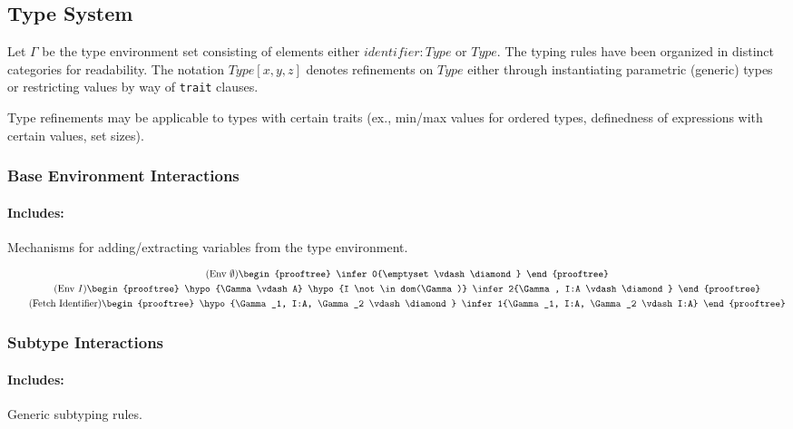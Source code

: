 
\subsection{Type System}
Let $\Gamma$ be the type environment set consisting of elements either $identifier: Type$ or $Type$. The typing rules have been organized in distinct categories for readability. The notation $Type[x, y, z]$ denotes refinements on $Type$ either through instantiating parametric (generic) types or restricting values by way of \texttt{trait} clauses.

Type refinements may be applicable to types with certain traits (ex., min/max values for ordered types, definedness of expressions with certain values, set sizes). %

\subsubsection{Base Environment Interactions}
\paragraph{Includes:} Mechanisms for adding/extracting variables from the type environment.

\begin{gather}
\tag{Env $\emptyset$}
\begin{prooftree}
\infer0{\emptyset \vdash \diamond}
\end{prooftree}
\\
\tag{Env $I$}
\begin{prooftree}
\hypo{\Gamma \vdash A}
\hypo{I \not\in dom(\Gamma)}
\infer2{\Gamma, I:A \vdash \diamond}
\end{prooftree}
\\
\tag{Fetch Identifier}
\begin{prooftree}
\hypo{\Gamma_1, I:A, \Gamma_2 \vdash \diamond}
\infer1{\Gamma_1, I:A, \Gamma_2 \vdash I:A}
\end{prooftree}
\end{gather}

\subsubsection{Subtype Interactions}
\paragraph{Includes:} Generic subtyping rules.

